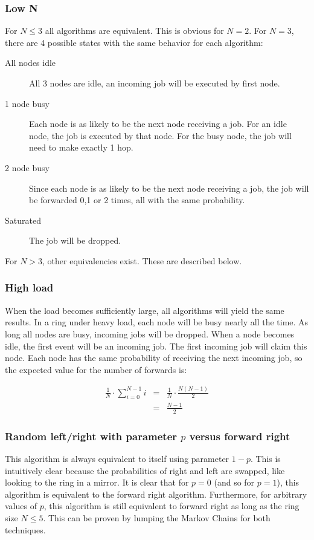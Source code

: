 \documentclass[10pt,a4paper]{article}
\begin{document}
\subsubsection*{Low N}
For $N \leq 3$ all algorithms are equivalent. This is obvious for $N=2$. For $N=3$, there are 4 possible states with the same behavior for each algorithm:
\begin{description}
\item[All nodes idle] All 3 nodes are idle, an incoming job will be executed by first node.
\item[1 node busy] Each node is as likely to be the next node receiving a job. For an idle node, the job is executed by that node. For the busy node, the job will need to make exactly 1 hop.
\item[2 node busy] Since each node is as likely to be the next node receiving a job, the job will be forwarded 0,1 or 2 times, all with the same probability.
\item[Saturated] The job will be dropped.
\end{description}

For $N>3$, other equivalencies exist. These are described below.

\subsubsection*{High load}
When the load becomes sufficiently large, all algorithms will yield the same results. In a ring under heavy load, each node will be busy nearly all the time. As long all nodes are busy, incoming jobs will be dropped.
When a node becomes idle, the first event will be an incoming job. The first incoming job will claim this node. Each node has the same probability of receiving the next incoming job, so the expected value for the number of forwards is:

\begin{eqnarray}
\frac{1}{N} \cdot \sum_{i=0}^{N-1} i &=& \frac{1}{N} \cdot \frac{N(N-1)}{2} \nonumber \\
&=& \frac{N-1}{2} \nonumber
\end{eqnarray}

\subsubsection*{Random left/right with parameter $p$ versus forward right}
This algorithm is always equivalent to itself using parameter $1-p$. This is intuitively clear because the probabilities of right and left are swapped, like looking to the ring in a mirror.
It is clear that for $p=0$ (and so for $p=1$), this algorithm is equivalent to the forward right algorithm. Furthermore, for arbitrary values of $p$, this algorithm is still equivalent to forward right as long as the ring size $N \leq 5$. This can be proven by lumping the Markov Chains for both techniques.
\end{document}
